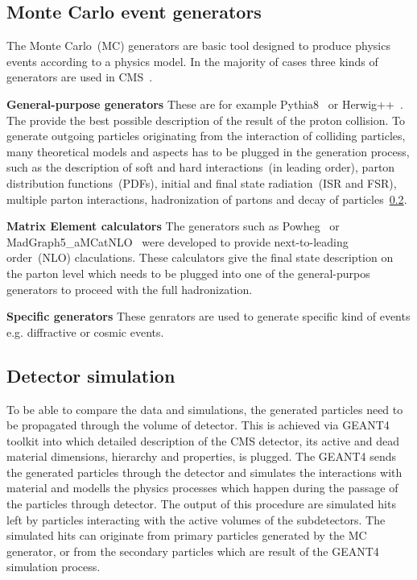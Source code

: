 
\subsection{Monte Carlo event generators}

The Monte Carlo~(MC) generators are basic tool designed to produce physics events according to a physics model. In the majority of cases three kinds of generators are used in CMS~\cite{website:generation, website:generationIntro}. 

\textbf{General-purpose generators}
These are for example Pythia8~\cite{Sjostrand:2014zea} or Herwig++~\cite{Bahr:2008pv}. The provide the best possible description of the result of the proton collision. To generate outgoing particles originating from the interaction of colliding particles, many theoretical models and aspects has to be plugged in the generation process, such as the description of soft and hard interactions~(in leading order), parton distribution functions~(PDFs), initial and final state radiation~(ISR and FSR), multiple parton interactions, hadronization of partons and decay of particles~\ref{}.

\textbf{Matrix Element calculators}
The generators such as Powheg~\cite{Oleari:2010nx} or MadGraph5\_aMCatNLO~\cite{Alwall:2014hca} were developed to provide next-to-leading order~(NLO) claculations. These calculators give the final state description on the parton level which needs to be plugged into one of the general-purpos generators to proceed with  the full hadronization.

\textbf{Specific generators}
These genrators are used to generate specific kind of events e.g. diffractive or cosmic events.


\subsection{Detector simulation}

To be able to compare the data and simulations, the generated particles need  to be propagated through the volume of detector. This is achieved via GEANT4~\cite{Agostinelli:2002hh ,Lefebure:1999wja} toolkit into which detailed description of the CMS detector, its active and dead material dimensions, hierarchy and properties, is plugged. The GEANT4 sends the generated particles through the detector and simulates the interactions with material and modells the physics processes which happen during the passage of the particles through detector. The output of this procedure are simulated hits left by particles interacting with the active volumes of the subdetectors. The simulated hits can originate from primary particles generated by the MC generator, or from the secondary particles which are result of the GEANT4 simulation process.

